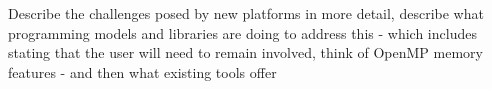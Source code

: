 Describe the challenges posed by new platforms in more detail, describe what programming models and libraries are doing to address this - which includes stating that the user will need to remain involved, think of OpenMP memory features - and then what existing tools offer
